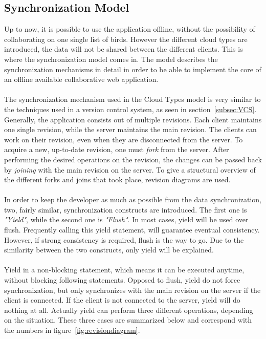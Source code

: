 \documentclass[a4paper,12pt]{report}
\begin{document}
\subsection{Synchronization Model}\label{subsec:SynchronizationModel}

Up to now, it is possible to use the application offline, without the possibility of collaborating on one single list of birds. However the different cloud types are introduced, the data will not be shared between the different clients. This is where the synchronization model comes in. The model describes the synchronization mechanisms in detail in order to be able to implement the core of an offline available collaborative web application.\\
\\
The synchronization mechanism used in the Cloud Types model is very similar to the techniques used in a version control system, as seen in section~\ref{subsec:VCS}. Generally, the application consists out of multiple revisions. Each client maintains one single revision, while the server maintains the main revision. The clients can work on their revision, even when they are disconnected from the server. To acquire a new, up-to-date revision, one must \textit{fork} from the server. After performing the desired operations on the revision, the changes can be passed back by \textit{joining} with the main revision on the server. To give a structural overview of the different forks and joins that took place, revision diagrams are used.\\
\\
In order to keep the developer as much as possible from the data synchronization, two, fairly similar, synchronization constructs are introduced. The first one is \textit{"Yield"}, while the second one is \textit{"Flush"}. In most cases, yield will be used over flush. Frequently calling this yield statement, will guarantee eventual consistency. However, if strong consistency is required, flush is the way to go. Due to the similarity between the two constructs, only yield will be explained.\\
\\
Yield in a non-blocking statement, which means it can be executed anytime, without blocking following statements. Opposed to flush, yield do not force synchronization, but only synchronizes with the main revision on the server if the client is connected. If the client is not connected to the server, yield will do nothing at all. Actually yield can perform three different operations, depending on the situation. These three cases are summarized below and correspond with the numbers in figure~\ref{fig:revisiondiagram}. 
\end{document}
